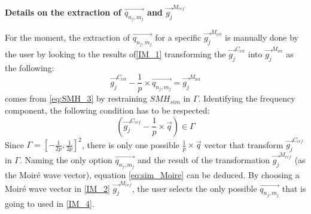 \documentclass[12pt]{article}
\begin{document}
\noindent\textbf{Details on the extraction of $\overrightarrow{q_{n_j,m_j}}$ and 
$\overrightarrow{g_j}^{M_{ref}}$}\bigskip

For the moment, the extraction of $\overrightarrow{q_{n_j,m_j}}$ for a specific 
$ \overrightarrow{g_j}^{M_{\text{ref}}}$ is manually done by the user by looking 
to the results of\cref{IM_1} transforming the 
$\overrightarrow{g_j}^{C_{\text{ref}}}$ into 
$\overrightarrow{g_j}^{M_{\text{ref}}}$ as the following:
\begin{equation}
\label{eq:sim_Moire}
{\overrightarrow{g_j}^{C_{\text{ref}}}}-\frac{1}{p} \times \overrightarrow{q_{n_j,m_j}} =  
\overrightarrow{g_j}^{M_{\text{ref}}}
\end{equation}
 comes from \cref{eq:SMH_3} by restraining $SMH_{sim}$ in 
$\Gamma$. Identifying the frequency component, the following condition has to be 
respected:
\begin{equation*}
(\overrightarrow{g_j}^{C_{ref}}-\frac{1}{p} \times \overrightarrow{q}) \in \Gamma
\end{equation*}
Since $\Gamma = [-\frac{1}{2p},\frac{1}{2p}]^{2}$, there is only one possible 
$\frac{1}{p}\times\overrightarrow{q}$ vector that transform 
$\overrightarrow{g_j}^{C_{ref}}$ in $\Gamma$. Naming the only option 
$\overrightarrow{q_{n_j,m_j}}$ and the result of the transformation 
$\overrightarrow{g_j}^{M_{ref}}$ (as the Moir{\'e} wave vector), equation 
\cref{eq:sim_Moire} can be deduced. By choosing a Moir{\'e} wave vector in 
\cref{IM_2} $\overrightarrow{g_j}^{M_{ref}}$, the user selects the only possible 
$\overrightarrow{q_{n_j,m_j}}$ that is going to used in \cref{IM_4}.
\end{document}
